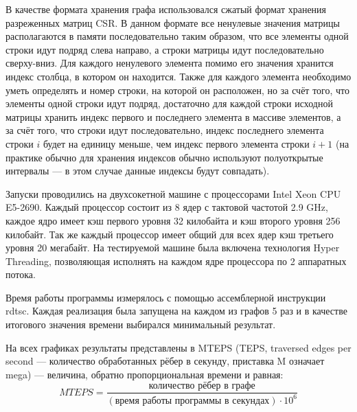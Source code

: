 \documentclass[a4paper,10pt]{extarticle}
\begin{document}
В качестве формата хранения графа использовался сжатый формат хранения разреженных матриц CSR. %
В данном формате все ненулевые значения матрицы располагаются в памяти последовательно таким образом, что все элементы одной строки идут подряд слева направо, а строки матрицы идут последовательно сверху-вниз. 
Для каждого ненулевого элемента помимо его значения хранится индекс столбца, в котором он находится. 
Также для каждого элемента необходимо уметь определять и номер строки, на которой он расположен, но за счёт того, что элементы одной строки идут подряд, достаточно для каждой строки исходной матрицы хранить индекс первого и последнего элемента в массиве элементов, а за счёт того, что строки идут последовательно, индекс последнего элемента строки $i$ будет на единицу меньше, чем индекс первого элемента строки $i+1$ (на практике обычно для хранения индексов обычно используют полуоткрытые интервалы --- в этом случае данные индексы будут совпадать).

Запуски проводились на двухсокетной машине с процессорами Intel Xeon CPU E5-2690. Каждый процессор состоит из 8 ядер с тактовой частотой 2.9 GHz, каждое ядро имеет кэш первого уровня 32 килобайта и   кэш второго уровня 256 килобайт. Так же каждый процессор имеет общий для всех ядер кэш третьего уровня 20 мегабайт.
На тестируемой машине была включена технология Hyper Threading, позволяющая исполнять на каждом ядре процессора по 2 аппаратных потока.

Время работы программы измерялось с помощью ассемблерной инструкции rdtsc.
Каждая реализация была запущена на каждом из графов 5 раз и в качестве итогового значения времени выбирался минимальный результат. 

На всех графиках результаты представлены в MTEPS (TEPS, traversed edges per second --- количество обработанных рёбер в секунду, приставка M означает mega) --- величина, обратно пропорциональная времени и равная:
$$MTEPS = \frac{\texttt{количество рёбер в графе}}{(\texttt{время работы программы в секундах}) \cdot 10^6}$$



\end{document}
